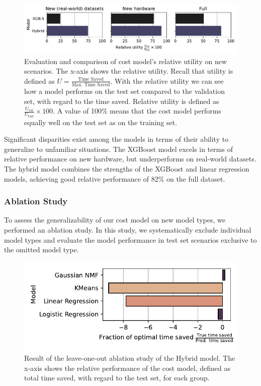 \begin{figure}
  \centering
  \includegraphics[width=\linewidth]{chapters/06_evaluation/figures/eval_generalization.pdf}
  \caption[Evaluation of utility on new scenarios]{Evaluation and comparison of cost model's relative utility on new scenarios. The x-axis shows the relative utility. Recall that utility is defined as $U=\frac{\text{Time Saved}}{\text{Max. Time Saved}}$. With the relative utility we can see how a model performs on the test set compared to the validation set, with regard to the time saved. Relative utility is defined as $\frac{U_{\text{val}}}{U_{\text{test}}} \times 100$. A value of 100\% means that the cost model performs equally well on the test set as on the training set.}
  \label{fig:6-generalization}
\end{figure}

Significant disparities exist among the models in terms of their ability to generalize to unfamiliar situations. The XGBoost model excels in terms of relative performance on new hardware, but underperforms on real-world datasets. The hybrid model combines the strengths of the XGBoost and linear regression models, achieving good relative performance of 82\% on the full dataset.

\subsubsection{Ablation Study}
\label{subsubsec:6-ablation}
To assess the generalizability of our cost model on new model types, we performed an ablation study. In this study, we systematically exclude individual model types and evaluate the model performance in test set scenarios exclusive to the omitted model type.

\begin{figure}[ht]
  \centering
  \includegraphics[width=0.6\linewidth]{chapters/06_evaluation/figures/hybrid-ablation.pdf}
  \caption[Results of the ablation study]{Result of the leave-one-out ablation study of the Hybrid model. The x-axis shows the relative performance of the cost model, defined as total time saved, with regard to the test set, for each group.}
  \label{fig:6-ablation}
\end{figure}

